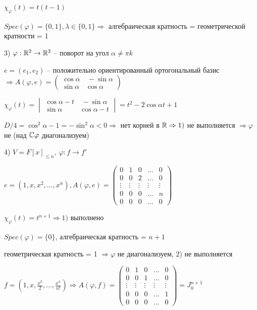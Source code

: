 $\chi_{\varphi} (t) = t (t - 1)$

$Spec(\varphi) = \{0, 1\}, \lambda \in \{0, 1\} \Rightarrow$ алгебраическая кратность = геометрической кратности = 1

3) $\varphi: \mathbb{R}^2 \rightarrow \mathbb{R}^2$ -- поворот на угол $\alpha \neq \pi k$

$e = (e_1, e_2)$ -- положительно ориентированный ортогональный базис $\Rightarrow A(\varphi, e) = \begin{pmatrix} \cos \alpha & \ - \sin \alpha \\ \sin \alpha & \cos \alpha \end{pmatrix}$

$\chi_{\varphi} (t) = \begin{vmatrix} \cos \alpha - t & \ -\sin \alpha \\ \sin \alpha & \cos \alpha - t \end{vmatrix} = t^2 - 2 \cos \alpha t + 1$

$D/4 = \cos^2 \alpha - 1 = -\sin^2 \alpha < 0 \Rightarrow$ нет корней в $\mathbb{R} \Rightarrow 1)$ не выполняется $\Rightarrow \varphi$ не (над $\mathbb{C} \varphi$ диагонализуем) 

4) $V = F[x]_{\leq n}, \ \varphi: f \rightarrow f'$

$e = (1, x, x^2, \dots, x^n), A(\varphi, e) = \begin{pmatrix} 0 & 1 & 0 & \dots & 0 \\ 0 & 0 & 2 & \dots & 0 \\ \vdots & \vdots & \vdots & \vdots & \vdots \\ 0 & 0 & 0 & \dots & n \\ 0 & 0 & 0 & \dots & 0
\end{pmatrix}$

$\chi_{\varphi} (t) = t^{n+1} \Rightarrow 1)$ выполнено

$Spec (\varphi) = \{0\}$, алгебраическая кратность = $n + 1$

геометрическая кратность = 1 $\Rightarrow \varphi$ не диагонализуем, 2) не выполняется

$f = (1, x, \frac{x^2}{2}, \dots, \frac{x^n}{n!}) \Rightarrow A(\varphi, f) = \begin{pmatrix} 0 & 1 & 0 & \dots & 0 \\ 0 & 0 & 1 & \dots & 0 \\ \vdots & \vdots & \vdots & \vdots & \vdots \\ 0 & 0 & 0 & \dots & 1 \\ 0 & 0 & 0 & \dots & 0 \end{pmatrix} = J_0^{n+1}$

